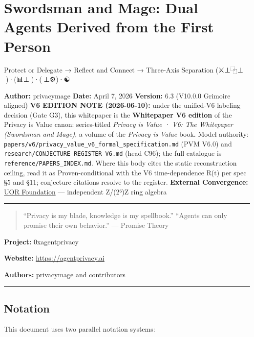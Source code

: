 \documentclass[
]{article}
\author{}
\date{}
\begin{document}
\section{Swordsman and Mage: Dual Agents Derived from the First
Person}\label{swordsman-and-mage-dual-agents-derived-from-the-first-person}

Protect or Delegate → Reflect and Connect → Three-Axis Separation
(⚔️⊥⿻⊥🧙)·(📊⊥🔮)·(🧠⊥⚙️)·☯️🔷 🙂

\textbf{Author:} privacymage \textbf{Date:} April 7, 2026
\textbf{Version:} 6.3 (V10.0.0 Grimoire aligned) \textbf{V6 EDITION NOTE
(2026-06-10):} under the unified-V6 labeling decision (Gate G3), this
whitepaper is the \textbf{Whitepaper V6 edition} of the Privacy is Value
canon: series-titled \emph{Privacy is Value · V6: The Whitepaper
(Swordsman and Mage)}, a volume of the \emph{Privacy is Value} book.
Model authority:
\texttt{papers/v6/privacy\_value\_v6\_formal\_specification.md} (PVM
V6.0) and \texttt{research/CONJECTURE\_REGISTER\_V6.md} (head C96); the
full catalogue is \texttt{reference/PAPERS\_INDEX.md}. Where this body
cites the static reconstruction ceiling, read it as Proven-conditional
with the V6 time-dependence R(t) per spec §5 and §11; conjecture
citations resolve to the register. \textbf{External Convergence:}
\href{https://github.com/UOR-Foundation}{UOR Foundation} --- independent
Z/(2⁶)Z ring algebra

\begin{center}\rule{0.5\linewidth}{0.5pt}\end{center}

\begin{quote}
``Privacy is my blade, knowledge is my spellbook.'' ``Agents can only
promise their own behavior.'' --- Promise Theory
\end{quote}

\textbf{Project:} \textbar{} 0xagentprivacy

\textbf{Website:} \textbar{} \url{https://agentprivacy.ai}

\textbf{Authors:} \textbar{} privacymage and contributors

\begin{center}\rule{0.5\linewidth}{0.5pt}\end{center}

\subsection{Notation}\label{notation}

This document uses two parallel notation systems:
\end{document}
